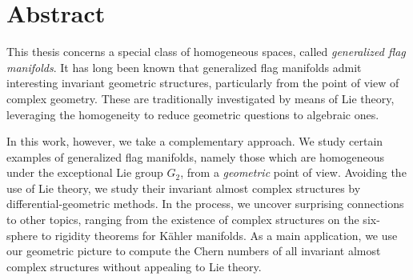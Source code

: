 \documentclass[parskip=half]{scrbook}
\begin{document}
\chapter*{Abstract}

This thesis concerns a special class of homogeneous spaces, called \emph{generalized flag manifolds}. It has long been known that generalized flag manifolds admit interesting invariant geometric structures, particularly from the point of view of complex geometry. These are traditionally investigated by means of Lie theory, leveraging the homogeneity to reduce geometric questions to algebraic ones. 

In this work, however, we take a complementary approach. We study certain examples of generalized flag manifolds, namely those which are homogeneous under the exceptional Lie group $G_2$, from a \emph{geometric} point of view. Avoiding the use of Lie theory, we study their invariant almost complex structures by differential-geometric methods. In the process, we uncover surprising connections to other topics, ranging from the existence of complex structures on the six-sphere to rigidity theorems for K\"ahler manifolds. As a main application, we use our geometric picture to compute the Chern numbers of all invariant almost complex structures without appealing to Lie theory.
\end{document}
